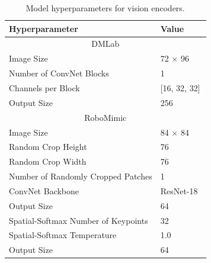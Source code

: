 \begin{table}[h]
\caption{Model hyperparameters for vision encoders.}
\vspace{0.1in}
\centering
\begin{tabular}{@{}ll@{}}
\toprule
\textbf{Hyperparameter} & \textbf{Value}    \\ \midrule
\multicolumn{2}{c}{DMLab} \\\midrule
Image Size     & 72 $\times$ 96 \\
Number of ConvNet Blocks     & 1       \\
Channels per Block      & [16, 32, 32]      \\
Output Size     & 256        \\\midrule
\multicolumn{2}{c}{RoboMimic} \\\midrule
Image Size     & 84 $\times$ 84 \\
Random Crop Height     & 76       \\
Random Crop Width     & 76       \\
Number of Randomly Cropped Patches     & 1       \\
ConvNet Backbone      & ResNet-18~\citep{he2015resnet}      \\
Output Size     & 64        \\
Spatial-Softmax Number of Keypoints     & 32        \\
Spatial-Softmax Temperature     & 1.0        \\
Output Size     & 64        \\\bottomrule
\end{tabular}
\label{supp:table:vision_encoder}
\end{table}
